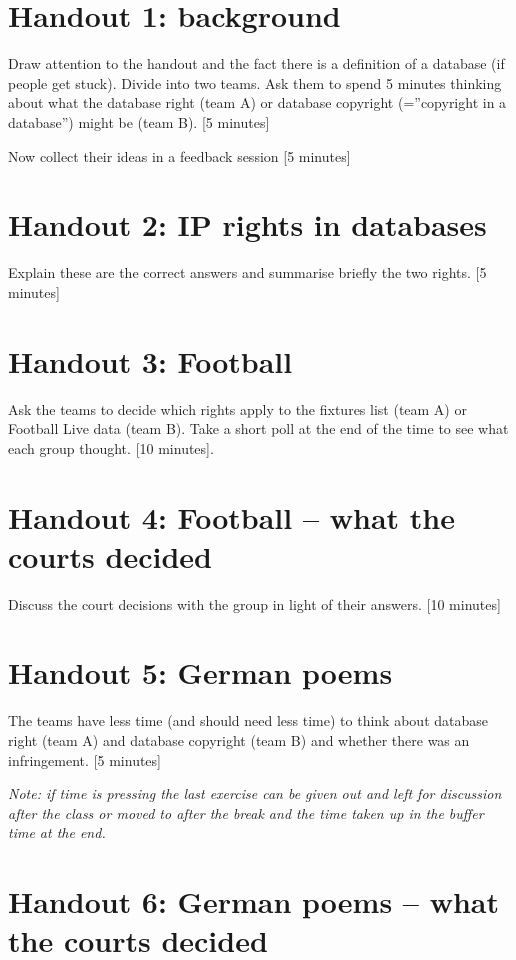 \documentclass{article}
\begin{document}
\section{Handout 1: background}

Draw attention to the handout and the fact there is a definition of a
database (if people get stuck). Divide into two teams. Ask them to spend
5 minutes thinking about what the database right (team A) or database
copyright (=''copyright in a database'') might be (team B). {[}5
minutes{]}

Now collect their ideas in a feedback session {[}5 minutes{]}

\section{Handout 2: IP rights in databases}

Explain these are the correct answers and summarise briefly the two
rights. {[}5 minutes{]}

\section{Handout 3: Football}

Ask the teams to decide which rights apply to the fixtures list (team A)
or Football Live data (team B). Take a short poll at the end of the time
to see what each group thought. {[}10 minutes{]}.

\section{Handout 4: Football -- what the courts decided}

Discuss the court decisions with the group in light of their answers.
{[}10 minutes{]}

\section{Handout 5: German poems}

The teams have less time (and should need less time) to think about
database right (team A) and database copyright (team B) and whether
there was an infringement. {[}5 minutes{]}

\emph{Note: if time is pressing the last exercise can be given out and
left for discussion after the class or moved to after the break and the
time taken up in the buffer time at the end.}

\section{Handout 6: German poems -- what the courts decided}
\end{document}

